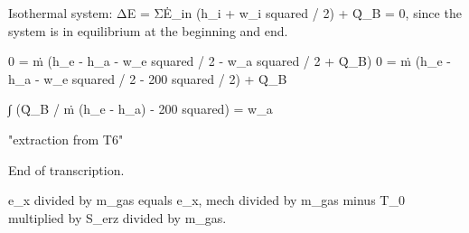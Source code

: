 Isothermal system:  
ΔE = ΣĖ_in (h_i + w_i squared / 2) + Q̇_B  
= 0, since the system is in equilibrium at the beginning and end.  

0 = ṁ (h_e - h_a - w_e squared / 2 - w_a squared / 2 + Q̇_B)  
0 = ṁ (h_e - h_a - w_e squared / 2 - 200 squared / 2) + Q̇_B  

∫ (Q̇_B / ṁ (h_e - h_a) - 200 squared) = w_a  

"extraction from T6"  

End of transcription.

e_x divided by m_gas equals e_x, mech divided by m_gas minus T_0 multiplied by S_erz divided by m_gas.